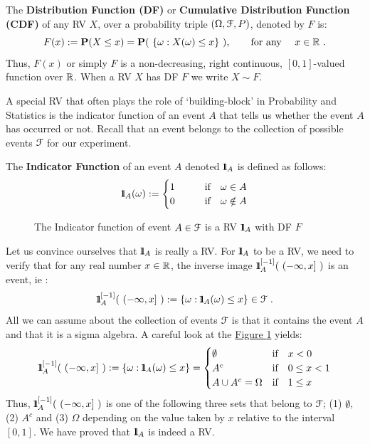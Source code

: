 \begin{definition}\label{D:DF}
The {\bf Distribution Function (DF)} or {\bf Cumulative Distribution Function (CDF)} of any RV $X$, over a  probability triple $(\Omega, \mathcal{F},P)$, denoted by $F$ is:
\begin{equation}\label{E:DF}
F(x) := \mathbf{P}(X \leq x) = \mathbf{P}( \ \{\omega: X(\omega) \leq x\} \ ), \qquad \text{for any }\quad x \in \mathbb{R} \ .
\end{equation}
Thus, $F(x)$ or simply $F$ is a non-decreasing, right continuous, $[0,1]$-valued function over $\mathbb{R}$.  When a RV $X$ has DF $F$ we write $X \sim F$.
\end{definition}

A special RV that often plays the role of `building-block' in Probability and Statistics is the indicator function of an event $A$ that tells us whether the event $A$ has occurred or not.  Recall that an event belongs to the collection of possible events $\mathcal{F}$ for our experiment.
\begin{definition}
The {\bf Indicator Function} of an event $A$ denoted ${1}\mspace{-11 mu}{1}_A$ is defined as follows:
\begin{equation}
{1}\mspace{-11 mu}{1}_A(\omega) := 
\begin{cases}
1 & \qquad \text{if} \quad \omega \in A \\
0 & \qquad \text{if} \quad \omega \notin A
\end{cases}
\end{equation}
\end{definition}
\begin{figure}[htpb]
\caption{The Indicator function of event $A \in \mathcal{F}$ is a RV ${1}\mspace{-11 mu}{1}_A$ with DF $F$ \label{F:RVIndic}}
\centering   {}
\end{figure}
\begin{classwork}
Let us convince ourselves that ${1}\mspace{-11 mu}{1}_A$ is really a RV.  For ${1}\mspace{-11 mu}{1}_A$ to be a RV, we need to verify that 
for any real number $x \in \mathbb{R}$, the inverse image $\BB{1}_A^{[-1]}( \ (- \infty, x] \ )$ is an event, ie :
\[
{1}\mspace{-11 mu}{1}_A^{[-1]}( \ (- \infty, x] \ ) := \{\omega: {1}\mspace{-11 mu}{1}_A(\omega) \leq x\} \in \mathcal{F} \ .
\] 
All we can assume about the collection of events $\mathcal{F}$ is that it contains the event $A$ and that it is a sigma algebra.  A careful look at the \hyperref[F:RVIndic]{Figure \ref*{F:RVIndic}} yields:
\begin{equation}
{1}\mspace{-11 mu}{1}_A^{[-1]}( \ (- \infty, x] \ ) := \{\omega: {1}\mspace{-11 mu}{1}_A(\omega) \leq x\} =
\begin{cases}
\emptyset & \text{if} \quad x < 0 \notag \\
A^c       & \text{if} \quad 0 \leq x < 1 \notag \\
A \cup A^c  = \Omega   & \text{if} \quad 1 \leq x  \notag 
\end{cases}
\end{equation}
Thus, $\BB{1}_A^{[-1]}( \ (- \infty, x] \ )$ is one of the following three sets that belong to $\mathcal{F}$; (1) $\emptyset$, (2) $A^c$ and (3) $\Omega$ depending on the value taken by $x$ relative to the interval $[0,1]$.  We have proved that ${1}\mspace{-11 mu}{1}_A$ is indeed a RV.
\end{classwork}
